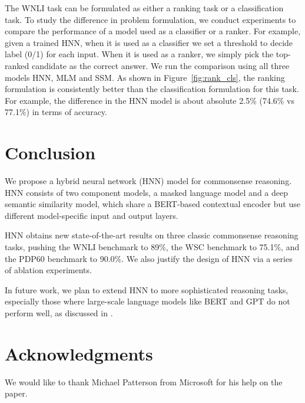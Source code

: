 \documentclass[11pt,a4paper]{article}
\newcommand{\wsc}{WSC}
\begin{document}
The WNLI task can be formulated as either a ranking task or a classification task. To study the difference in problem formulation, we conduct experiments to compare the performance of a model used as a classifier or a ranker. For example, given a trained HNN, when it is used as a classifier we set a threshold to decide label (0/1) for each input. When it is used as a ranker, we simply pick the top-ranked candidate as the correct answer.
We run the comparison using all three models HNN, MLM and SSM. 
As shown in Figure~\ref{fig:rank_cls}, the ranking formulation is consistently better than the classification formulation for this task. 
For example, the difference in the HNN model is about absolute 2.5\% (74.6\% vs 77.1\%) in terms of accuracy. 
















 
\section{Conclusion}
\label{sec:con}
We propose a hybrid neural network (HNN) model for commonsense reasoning.
HNN consists of two component models, a masked language model and a deep semantic similarity model, which share a BERT-based contextual encoder but use different model-specific input and output layers.

HNN obtains new state-of-the-art results on three classic commonsense reasoning tasks, pushing the WNLI benchmark to 89\%, the {\wsc} benchmark to 75.1\%, and the PDP60 benchmark to 90.0\%. We also justify the design of HNN via a series of ablation experiments.

In future work, we plan to extend HNN to more sophisticated reasoning tasks, especially those where large-scale language models like BERT and GPT do not perform well, as discussed in \cite{gao2019neural, niven2019probing}.  


\section*{Acknowledgments}
We would like to thank Michael Patterson from Microsoft for his help on the paper.  




\end{document}
